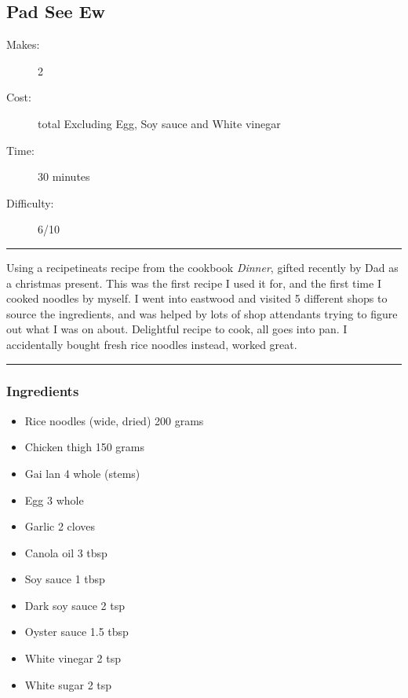 \documentclass[]{article}
\begin{document}
\subsection*{\center\huge Pad See Ew}
\begin{description}
\item[Makes:] 2 
\item[Cost:]  total Excluding Egg, Soy sauce and White vinegar
\item[Time:] 30 minutes
\item[Difficulty:] 6/10
\end{description}
\vspace{0.2cm}\hrule\vspace{0.5cm}
\begin{adjustwidth}{0.5 cm}{0.5 cm}

Using a recipetineats recipe from the cookbook \textit{Dinner}, gifted recently by Dad as a christmas present. This was the first recipe I used it for, and the first time I cooked noodles by myself. I went into eastwood and visited 5 different shops to source the ingredients, and was helped by lots of shop attendants trying to figure out what I was on about. Delightful recipe to cook, all goes into pan. I accidentally bought fresh rice noodles instead, worked great. \hfill{}\color{black}

\end{adjustwidth}
\vspace{0.5cm}\hrule
\subsubsection*{\Large Ingredients}
\begin{multicols}{2}
\begin{itemize}
 \item Rice noodles (wide, dried) \hfill 200 grams
 \item Chicken thigh \hfill 150 grams
 \item Gai lan \hfill 4 whole (stems)
 \item Egg \hfill 3 whole
 \item Garlic \hfill 2 cloves
 \item Canola oil \hfill 3 tbsp
 \item Soy sauce \hfill 1 tbsp
 \item Dark soy sauce \hfill 2 tsp
 \item Oyster sauce \hfill 1.5 tbsp
 \item White vinegar \hfill 2 tsp
 \item White sugar \hfill 2 tsp
\end{itemize}
\end{multicols}
\end{document}
